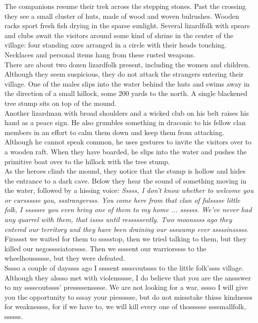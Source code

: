 The companions resume their trek across the stepping stones. Past the crossing they see a small cluster of huts, made of wood and woven bulrushes. Wooden racks sport fresh fish drying in the sparse sunlight. Several lizardfolk with spears and clubs await the visitors around some kind of shrine in the center of the village: four standing axes arranged in a circle with their heads touching. Necklaces and personal items hang from these rusted weapons.\\

There are about two dozen lizardfolk present, including the women and children. Although they seem suspicious, they do not attack the strangers entering their village. One of the males slips into the water behind the huts and swims away in the direction of a small hillock, some 200 yards to the north. A single blackened tree stump sits on top of the mound.\\

Another lizardman with broad shoulders and a wicked club on his belt raises his hand as a peace sign. He also grumbles something in draconic to his fellow clan members in an effort to calm them down and keep them from attacking. Although he cannot speak common, he uses gestures to invite the visitors over to a wooden raft. When they have boarded, he slips into the water and pushes the primitive boat over to the hillock with the tree stump.\\

As the heroes climb the mound, they notice that the stump is hollow and hides the entrance to a dark cave. Below they hear the sound of something moving in the water, followed by a hissing voice: {\itshape Sssss, I don't know whether to welcome you or curssssse you, ssstrangersss. You come here from that clan of falsssse little folk, I sssssee you even bring one of them to my home ... ssssss. We've never had any quarrel with them, that issss until resssssently. Two moonssss ago they entered our territory and they have been draining our ssswamp ever sssssinsssss.}  Firsssst we waited for them to ssssstop, then we tried talking to them, but they killed our negossssiatorssss. Then we ssssent our warriorssss to the wheelhoussssse, but they were defeated.\\

Sssso a couple of dayssss ago I ssssent sssscoutssss to the little folk'ssss village. Although they alssso met with violensssse, I do believe that you are the anssswer to my sssscoutssss' pressssensssse. We are not looking for a war, sssso I will give you the opportunity to sssay your piessssse, but do not missstake thisss kindnesss for weaknessss, for if we have to, we will kill every one of thossssse ssssmallfolk, ssssss.\\

